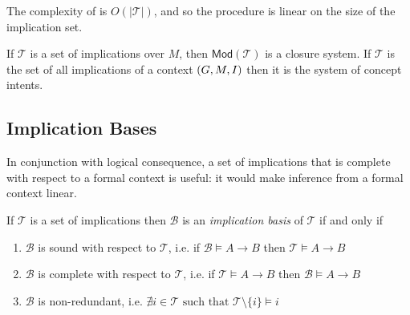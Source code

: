 \begin{proposition}
	\label{proposition:complexity-lin-closure}

	The complexity of  is $O(\vert \mathcal{T}\vert)$,
	and so the procedure is linear on the size of the implication set.
\end{proposition}





\begin{corollary}
	\label{corollary:closure-system-intents}

	If $\mathcal{T}$ is a set of implications over $M$, then $\mathsf{Mod}(\mathcal{T})$ is a closure system. If $\mathcal{T}$ is the set of all implications of a context $(G,M,\mathrel{I})$ then it is the system of concept intents.
\end{corollary}

\subsection{Implication Bases}
\label{subsection:implication-bases}

In conjunction with logical consequence, a set of implications that is complete with
respect to a formal context is useful: it would make inference from a formal
context linear.

\begin{definition}
	\label{definition:implication-basis}

	If $\mathcal{T}$ is a set of implications then $\mathcal{B}$ is an \emph{implication basis} of $\mathcal{T}$ if and only if
	\begin{enumerate}
		\item $\mathcal{B}$ is sound with respect to $\mathcal{T}$, i.e. if
		      $\mathcal{B}\vDash A \rightarrow B$ then
		      $\mathcal{T}\vDash A \rightarrow B$

		\item $\mathcal{B}$ is complete with respect to $\mathcal{T}$, i.e. if
		      $\mathcal{T}\vDash A \rightarrow B$ then
		      $\mathcal{B}\vDash A \rightarrow B$

		\item $\mathcal{B}$ is non-redundant, i.e. $\nexists i \in \mathcal{T} \text{ such that } \mathcal{T}\setminus \{i\} \vDash i$

	\end{enumerate}
\end{definition}

